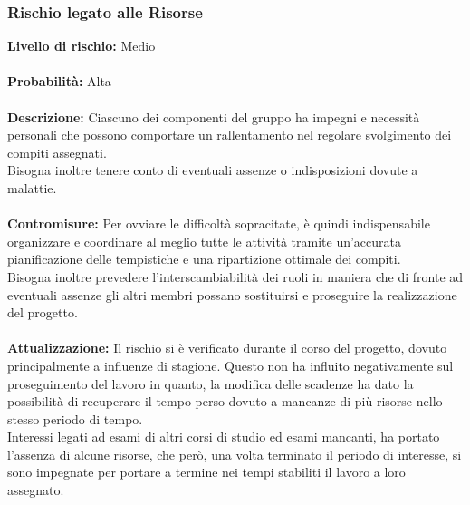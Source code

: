 	\subsubsection{Rischio legato alle Risorse}
	\label{AnalisiDeiRischi_Personale}
		\textbf{Livello di rischio:} Medio
		\\ \\
		\textbf{Probabilità:} Alta
		\\ \\
		\textbf{Descrizione:} Ciascuno dei componenti del gruppo ha impegni e necessità personali che possono comportare un rallentamento nel regolare svolgimento dei compiti assegnati.\\
		Bisogna inoltre tenere conto di eventuali assenze o indisposizioni dovute a malattie.
		\\ \\
		\textbf{Contromisure:} Per ovviare le difficoltà sopracitate, è quindi indispensabile organizzare e coordinare al meglio tutte le attività tramite un'accurata pianificazione delle tempistiche e una ripartizione ottimale dei compiti.\\
		Bisogna inoltre prevedere l'interscambiabilità dei ruoli in maniera che di fronte ad eventuali assenze gli altri membri possano sostituirsi e proseguire la realizzazione del progetto.
		\\ \\
		\textbf{Attualizzazione:} Il rischio si è verificato durante il corso del progetto, dovuto principalmente a influenze di stagione. Questo non ha influito negativamente sul proseguimento del lavoro in quanto, la modifica delle scadenze ha dato la possibilità di recuperare il tempo perso dovuto a mancanze di più risorse nello stesso periodo di tempo. \\
		Interessi legati ad esami di altri corsi di studio ed esami mancanti, ha portato l'assenza di alcune risorse, che però, una volta terminato il periodo di interesse, si sono impegnate per portare a termine nei tempi stabiliti il lavoro a loro assegnato.
		
